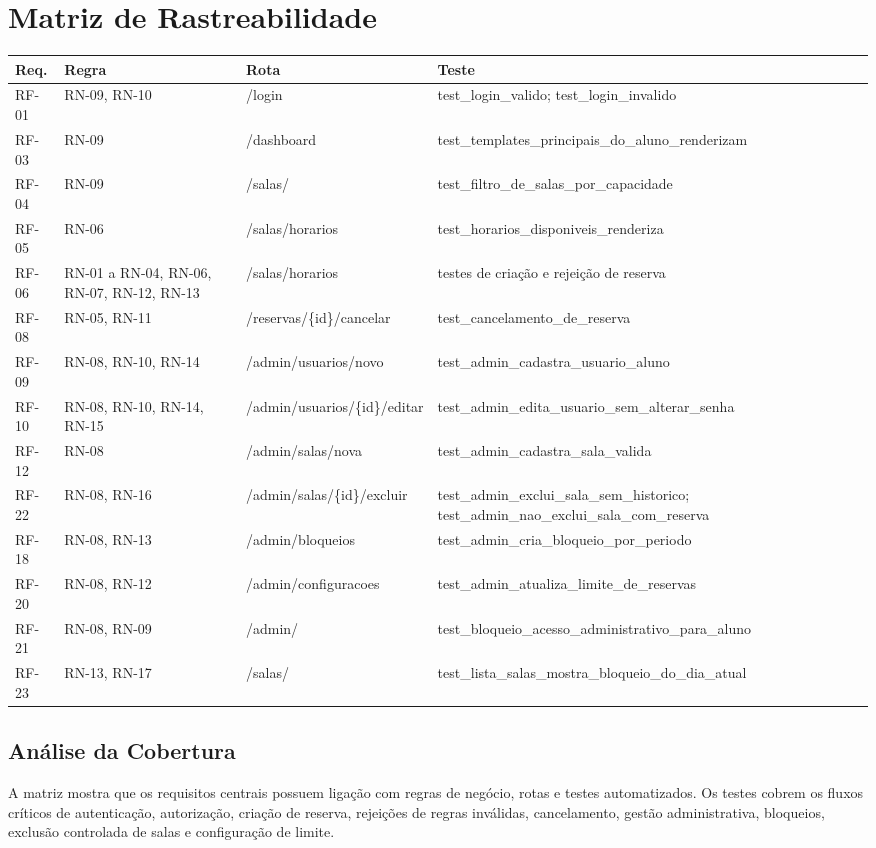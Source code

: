\documentclass[12pt,a4paper]{article}
\begin{document}
\section{Matriz de Rastreabilidade}
\small
\begin{longtable}{|p{2cm}|p{2.5cm}|p{3.2cm}|p{6.8cm}|}
\hline
\textbf{Req.} & \textbf{Regra} & \textbf{Rota} & \textbf{Teste} \\ \hline
RF-01 & RN-09, RN-10 & /login & test\_login\_valido; test\_login\_invalido \\ \hline
RF-03 & RN-09 & /dashboard & test\_templates\_principais\_do\_aluno\_renderizam \\ \hline
RF-04 & RN-09 & /salas/ & test\_filtro\_de\_salas\_por\_capacidade \\ \hline
RF-05 & RN-06 & /salas/horarios & test\_horarios\_disponiveis\_renderiza \\ \hline
RF-06 & RN-01 a RN-04, RN-06, RN-07, RN-12, RN-13 & /salas/horarios & testes de criação e rejeição de reserva \\ \hline
RF-08 & RN-05, RN-11 & /reservas/\{id\}/cancelar & test\_cancelamento\_de\_reserva \\ \hline
RF-09 & RN-08, RN-10, RN-14 & /admin/usuarios/novo & test\_admin\_cadastra\_usuario\_aluno \\ \hline
RF-10 & RN-08, RN-10, RN-14, RN-15 & /admin/usuarios/\{id\}/editar & test\_admin\_edita\_usuario\_sem\_alterar\_senha \\ \hline
RF-12 & RN-08 & /admin/salas/nova & test\_admin\_cadastra\_sala\_valida \\ \hline
RF-22 & RN-08, RN-16 & /admin/salas/\{id\}/excluir & test\_admin\_exclui\_sala\_sem\_historico; test\_admin\_nao\_exclui\_sala\_com\_reserva \\ \hline
RF-18 & RN-08, RN-13 & /admin/bloqueios & test\_admin\_cria\_bloqueio\_por\_periodo \\ \hline
RF-20 & RN-08, RN-12 & /admin/configuracoes & test\_admin\_atualiza\_limite\_de\_reservas \\ \hline
RF-21 & RN-08, RN-09 & /admin/ & test\_bloqueio\_acesso\_administrativo\_para\_aluno \\ \hline
RF-23 & RN-13, RN-17 & /salas/ & test\_lista\_salas\_mostra\_bloqueio\_do\_dia\_atual \\ \hline
\end{longtable}
\normalsize

\subsection{Análise da Cobertura}
A matriz mostra que os requisitos centrais possuem ligação com regras de negócio, rotas e testes automatizados. Os testes cobrem os fluxos críticos de autenticação, autorização, criação de reserva, rejeições de regras inválidas, cancelamento, gestão administrativa, bloqueios, exclusão controlada de salas e configuração de limite.
\end{document}
